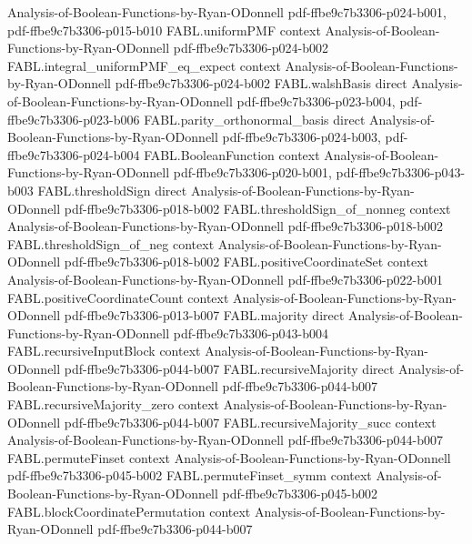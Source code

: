 \begin{theorem}
  {Analysis-of-Boolean-Functions-by-Ryan-ODonnell}
  {pdf-ffbe9c7b3306-p024-b001,
    pdf-ffbe9c7b3306-p015-b010}
\proofstep
  {FABL.uniformPMF}
  {context}
  {Analysis-of-Boolean-Functions-by-Ryan-ODonnell}
  {pdf-ffbe9c7b3306-p024-b002}
\proofstep
  {FABL.integral_uniformPMF_eq_expect}
  {context}
  {Analysis-of-Boolean-Functions-by-Ryan-ODonnell}
  {pdf-ffbe9c7b3306-p024-b002}
\proofstep
  {FABL.walshBasis}
  {direct}
  {Analysis-of-Boolean-Functions-by-Ryan-ODonnell}
  {pdf-ffbe9c7b3306-p023-b004,
    pdf-ffbe9c7b3306-p023-b006}
\proofstep
  {FABL.parity_orthonormal_basis}
  {direct}
  {Analysis-of-Boolean-Functions-by-Ryan-ODonnell}
  {pdf-ffbe9c7b3306-p024-b003,
    pdf-ffbe9c7b3306-p024-b004}
\proofstep
  {FABL.BooleanFunction}
  {context}
  {Analysis-of-Boolean-Functions-by-Ryan-ODonnell}
  {pdf-ffbe9c7b3306-p020-b001,
    pdf-ffbe9c7b3306-p043-b003}
\proofstep
  {FABL.thresholdSign}
  {direct}
  {Analysis-of-Boolean-Functions-by-Ryan-ODonnell}
  {pdf-ffbe9c7b3306-p018-b002}
\proofstep
  {FABL.thresholdSign_of_nonneg}
  {context}
  {Analysis-of-Boolean-Functions-by-Ryan-ODonnell}
  {pdf-ffbe9c7b3306-p018-b002}
\proofstep
  {FABL.thresholdSign_of_neg}
  {context}
  {Analysis-of-Boolean-Functions-by-Ryan-ODonnell}
  {pdf-ffbe9c7b3306-p018-b002}
\proofstep
  {FABL.positiveCoordinateSet}
  {context}
  {Analysis-of-Boolean-Functions-by-Ryan-ODonnell}
  {pdf-ffbe9c7b3306-p022-b001}
\proofstep
  {FABL.positiveCoordinateCount}
  {context}
  {Analysis-of-Boolean-Functions-by-Ryan-ODonnell}
  {pdf-ffbe9c7b3306-p013-b007}
\proofstep
  {FABL.majority}
  {direct}
  {Analysis-of-Boolean-Functions-by-Ryan-ODonnell}
  {pdf-ffbe9c7b3306-p043-b004}
\proofstep
  {FABL.recursiveInputBlock}
  {context}
  {Analysis-of-Boolean-Functions-by-Ryan-ODonnell}
  {pdf-ffbe9c7b3306-p044-b007}
\proofstep
  {FABL.recursiveMajority}
  {direct}
  {Analysis-of-Boolean-Functions-by-Ryan-ODonnell}
  {pdf-ffbe9c7b3306-p044-b007}
\proofstep
  {FABL.recursiveMajority_zero}
  {context}
  {Analysis-of-Boolean-Functions-by-Ryan-ODonnell}
  {pdf-ffbe9c7b3306-p044-b007}
\proofstep
  {FABL.recursiveMajority_succ}
  {context}
  {Analysis-of-Boolean-Functions-by-Ryan-ODonnell}
  {pdf-ffbe9c7b3306-p044-b007}
\proofstep
  {FABL.permuteFinset}
  {context}
  {Analysis-of-Boolean-Functions-by-Ryan-ODonnell}
  {pdf-ffbe9c7b3306-p045-b002}
\proofstep
  {FABL.permuteFinset_symm}
  {context}
  {Analysis-of-Boolean-Functions-by-Ryan-ODonnell}
  {pdf-ffbe9c7b3306-p045-b002}
\proofstep
  {FABL.blockCoordinatePermutation}
  {context}
  {Analysis-of-Boolean-Functions-by-Ryan-ODonnell}
  {pdf-ffbe9c7b3306-p044-b007}

\end{theorem}
